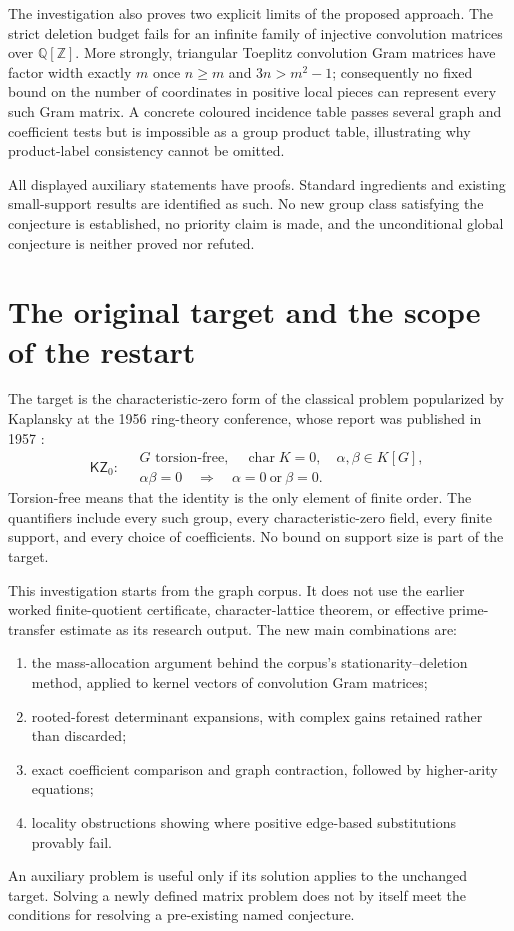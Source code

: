 \documentclass[11pt,a4paper,oneside]{report}
\theoremstyle{definition}
\theoremstyle{remark}
\newcommand{\Q}{\mathbb Q}
\newcommand{\Z}{\mathbb Z}
\newcommand{\KZ}{\mathsf{KZ}_0}
\begin{document}
The investigation also proves two explicit limits of the proposed approach. The strict deletion budget fails for an infinite family of injective convolution matrices over \(\Q[\Z]\). More strongly, triangular Toeplitz convolution Gram matrices have factor width exactly \(m\) once \(n\ge m\) and \(3n>m^2-1\); consequently no fixed bound on the number of coordinates in positive local pieces can represent every such Gram matrix. A concrete coloured incidence table passes several graph and coefficient tests but is impossible as a group product table, illustrating why product-label consistency cannot be omitted.

All displayed auxiliary statements have proofs. Standard ingredients and existing small-support results are identified as such. No new group class satisfying the conjecture is established, no priority claim is made, and the unconditional global conjecture is neither proved nor refuted.
\medskip
\section{The original target and the scope of the restart}
The target is the characteristic-zero form of the classical problem popularized by Kaplansky at the 1956 ring-theory conference, whose report was published in 1957 \cite{B:Kaplansky}:
\begin{equation}\label{M02:eq:target}
\KZ:\quad
\begin{gathered}
G\text{ torsion-free},\quad \operatorname{char}K=0,\quad
\alpha,\beta\in K[G],\\
\alpha\beta=0\quad\Longrightarrow\quad \alpha=0\ \text{or}\ \beta=0.
\end{gathered}
\end{equation}
Torsion-free means that the identity is the only element of finite order. The quantifiers include every such group, every characteristic-zero field, every finite support, and every choice of coefficients. No bound on support size is part of the target.

This investigation starts from the graph corpus. It does not use the earlier worked finite-quotient certificate, character-lattice theorem, or effective prime-transfer estimate as its research output. The new main combinations are:
\begin{enumerate}
\item the mass-allocation argument behind the corpus's stationarity--deletion method, applied to kernel vectors of convolution Gram matrices;
\item rooted-forest determinant expansions, with complex gains retained rather than discarded;
\item exact coefficient comparison and graph contraction, followed by higher-arity equations;
\item locality obstructions showing where positive edge-based substitutions provably fail.
\end{enumerate}
An auxiliary problem is useful only if its solution applies to the unchanged target. Solving a newly defined matrix problem does not by itself meet the conditions for resolving a pre-existing named conjecture.
\end{document}
